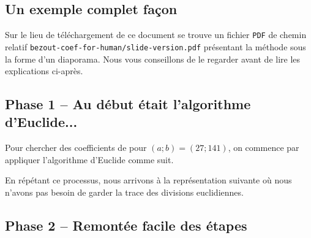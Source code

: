 \subsection{Un exemple complet façon }

Sur le lieu de téléchargement de ce document se trouve un fichier \verb+PDF+ de chemin relatif \verb+bezout-coef-for-human/slide-version.pdf+ présentant la méthode sous la forme d'un diaporama. Nous vous conseillons de le regarder avant de lire les explications ci-après.




\subsection{Phase 1 -- Au début était l'algorithme d'Euclide...}

Pour chercher des coefficients de \bb{} pour $(a ; b) = (27 ; 141)$, on commence par appliquer l'algorithme d'Euclide  comme suit.

\begin{multicols}{2}

	\columnbreak
	
\end{multicols}

\begin{multicols}{2}

	\columnbreak
	
\end{multicols}


\medskip


En répétant ce processus, nous arrivons à la représentation suivante où nous n'avons pas besoin de garder la trace des divisions euclidiennes.





\subsection{Phase 2 -- Remontée facile des étapes}

